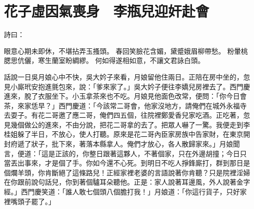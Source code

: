 %

\chapter{花子虛因氣喪身　李瓶兒迎奸赴會}

詩曰：

眼意心期未即休，不堪拈弄玉搔頭。
春回笑臉花含媚，黛蹙娥眉柳帶愁。
粉暈桃腮思伉儷，寒生蘭室盼綢繆。
何如得遂相如意，不讓文君詠白頭。

話說一日吳月娘心中不快，吳大妗子來看，月娘留他住兩日。正陪在房中坐的，忽見小廝玳安抱進氈包來，說：「爹來家了。」吳大妗子便往李嬌兒房裡去了。西門慶進來，脫了衣服坐下。小玉拿茶來也不吃。月娘見他面色改常，便問：「你今日會茶，來家恁早？」西門慶道：「今該常二哥會，他家沒地方，請俺們在城外永福寺去耍子。有花二哥邀了應二哥，俺們四五個，往院裡鄭愛香兒家吃酒。正吃著，忽見幾個做公的進來，不由分說，把花二哥拿的去了。把眾人嚇了一驚。我便走到李桂姐躲了半日，不放心，使人打聽。原來是花二哥內臣家房族中告家財，在東京開封府遞了狀子，批下來，著落本縣拿人。俺們才放心，各人散歸家來。」月娘聞言，便道：「這是正該的，你整日跟著這夥人，不著個家，只在外邊胡撞；今日只當丟出事來，才是個了手。你如今還不心死。到明日不吃人掙鋒廝打，群到那日是個爛羊頭，你肯斷絕了這條路兒！正經家裡老婆的言語說著你肯聽？只是院裡淫婦在你跟前說句話兒，你到著個驢耳朵聽他。正是：家人說著耳邊風，外人說著金字經。」西門慶笑道：「誰人敢七個頭八個膽打我！」月娘道：「你這行貨子，只好家裡嘴頭子罷了。」

